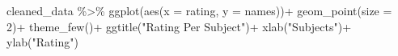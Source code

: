 \documentclass[
  12,
  letterpaper,
  DIV=11,
  numbers=noendperiod]{scrartcl}
\newenvironment{Shaded}{\begin{snugshade}}{\end{snugshade}}
\newcommand{\AttributeTok}[1]{\textcolor[rgb]{0.40,0.45,0.13}{#1}}
\newcommand{\DecValTok}[1]{\textcolor[rgb]{0.68,0.00,0.00}{#1}}
\newcommand{\FunctionTok}[1]{\textcolor[rgb]{0.28,0.35,0.67}{#1}}
\newcommand{\NormalTok}[1]{\textcolor[rgb]{0.00,0.23,0.31}{#1}}
\newcommand{\SpecialCharTok}[1]{\textcolor[rgb]{0.37,0.37,0.37}{#1}}
\newcommand{\StringTok}[1]{\textcolor[rgb]{0.13,0.47,0.30}{#1}}
\begin{document}
\begin{Shaded}
\begin{Highlighting}[]
\NormalTok{cleaned\_data }\SpecialCharTok{\%\textgreater{}\%} 
  \FunctionTok{ggplot}\NormalTok{(}\FunctionTok{aes}\NormalTok{(}\AttributeTok{x =}\NormalTok{ rating,}
             \AttributeTok{y =}\NormalTok{ names))}\SpecialCharTok{+}
  \FunctionTok{geom\_point}\NormalTok{(}\AttributeTok{size =} \DecValTok{2}\NormalTok{)}\SpecialCharTok{+}
  \FunctionTok{theme\_few}\NormalTok{()}\SpecialCharTok{+}
  \FunctionTok{ggtitle}\NormalTok{(}\StringTok{"Rating Per Subject"}\NormalTok{)}\SpecialCharTok{+}
  \FunctionTok{xlab}\NormalTok{(}\StringTok{"Subjects"}\NormalTok{)}\SpecialCharTok{+}
  \FunctionTok{ylab}\NormalTok{(}\StringTok{"Rating"}\NormalTok{)}
\end{Highlighting}
\end{Shaded}
\end{document}
